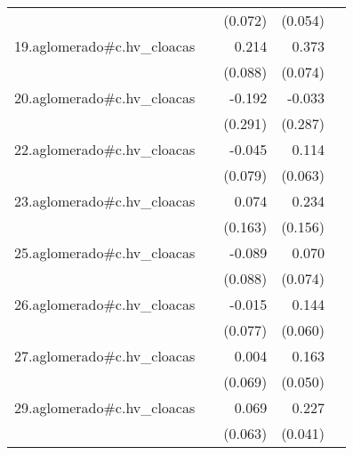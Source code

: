 {\begin{longtable}{l*{4}{D{.}{.}{-1}}}
            &                     &     (0.072)         &     (0.054)         &                     \\
\addlinespace
19.aglomerado#c.hv\_cloacas&                     &       0.214\sym{*}  &       0.373\sym{***}&                     \\
            &                     &     (0.088)         &     (0.074)         &                     \\
\addlinespace
20.aglomerado#c.hv\_cloacas&                     &      -0.192         &      -0.033         &                     \\
            &                     &     (0.291)         &     (0.287)         &                     \\
\addlinespace
22.aglomerado#c.hv\_cloacas&                     &      -0.045         &       0.114         &                     \\
            &                     &     (0.079)         &     (0.063)         &                     \\
\addlinespace
23.aglomerado#c.hv\_cloacas&                     &       0.074         &       0.234         &                     \\
            &                     &     (0.163)         &     (0.156)         &                     \\
\addlinespace
25.aglomerado#c.hv\_cloacas&                     &      -0.089         &       0.070         &                     \\
            &                     &     (0.088)         &     (0.074)         &                     \\
\addlinespace
26.aglomerado#c.hv\_cloacas&                     &      -0.015         &       0.144\sym{*}  &                     \\
            &                     &     (0.077)         &     (0.060)         &                     \\
\addlinespace
27.aglomerado#c.hv\_cloacas&                     &       0.004         &       0.163\sym{**} &                     \\
            &                     &     (0.069)         &     (0.050)         &                     \\
\addlinespace
29.aglomerado#c.hv\_cloacas&                     &       0.069         &       0.227\sym{***}&                     \\
            &                     &     (0.063)         &     (0.041)         &                     \\

\end{longtable}}
